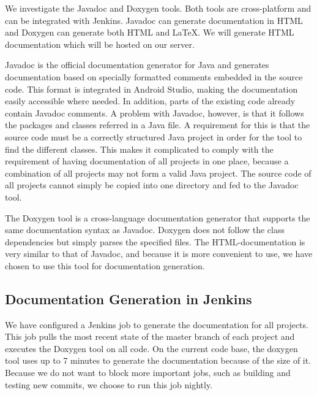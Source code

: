 We investigate the Javadoc \parencite{javadoc} and Doxygen \parencite{doxygen} tools. Both tools are cross-platform and can be integrated with Jenkins. Javadoc can generate documentation in HTML and Doxygen can generate both HTML and \LaTeX. We will generate HTML documentation which will be hosted on our server.

Javadoc is the official documentation generator for Java and generates documentation based on specially formatted comments embedded in the source code. This format is integrated in Android Studio, making the documentation easily accessible where needed. In addition, parts of the existing code already contain Javadoc comments. A problem with Javadoc, however, is that it follows the packages and classes referred in a Java file. A requirement for this is that the source code must be a correctly structured Java project in order for the tool to find the different classes. This makes it complicated to comply with the requirement of having documentation of all projects in one place, because a combination of all projects may not form a valid Java project. The source code of all projects cannot simply be copied into one directory and fed to the Javadoc tool.

The Doxygen tool is a cross-language documentation generator that supports the same documentation syntax as Javadoc. Doxygen does not follow the class dependencies but simply parses the specified files. The HTML-documentation is very similar to that of Javadoc, and because it is more convenient to use, we have chosen to use this tool for documentation generation.

\subsection{Documentation Generation in Jenkins}
We have configured a Jenkins job to generate the documentation for all projects. This job pulls the most recent state of the master branch of each project and executes the Doxygen tool on all code. On the current code base, the doxygen tool uses up to 7 minutes to generate the documentation because of the size of it. Because we do not want to block more important jobs, such as building and testing new commits, we choose to run this job nightly.